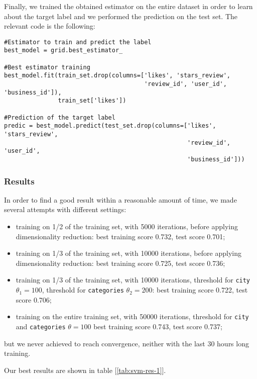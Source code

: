 Finally, we trained the obtained estimator on the entire dataset in order to learn about the target label and we performed the prediction on the test set. The relevant code is the following:

\begin{lstlisting}[caption={Linear SVM training and predictions},label={lst:svm-fit}]
#Estimator to train and predict the label
best_model = grid.best_estimator_

#Best estimator training
best_model.fit(train_set.drop(columns=['likes', 'stars_review',
                                       'review_id', 'user_id', 'business_id']),
               train_set['likes'])

#Prediction of the target label
predic = best_model.predict(test_set.drop(columns=['likes', 'stars_review',
                                                   'review_id', 'user_id', 
                                                   'business_id']))
\end{lstlisting}

\subsubsection{Results}

In order to find a good result within a reasonable amount of time, we made several attempts with different settings:
\begin{itemize}
    \item training on 1/2 of the training set, with 5000 iterations, before applying dimensionality reduction: best training score 0.732, test score 0.701;
    \item training on 1/3 of the training set, with 10000 iterations, before applying dimensionality reduction: best training score 0.725, test score 0.736;
    \item training on 1/3 of the training set, with 10000 iterations, threshold for \texttt{city} $\theta_1=100$, threshold for \texttt{categories} $\theta_2=200$: best training score 0.722, test score 0.706;
    \item training on the entire training set, with 50000 iterations, threshold for \texttt{city} and \texttt{categories} $\theta=100$ best training score 0.743, test score 0.737;
\end{itemize}
but we never achieved to reach convergence, neither with the last 30 hours long training.

Our best results are shown in table [\ref{tab:svm-res-1}].

